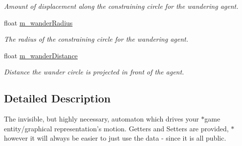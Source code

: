 \begin{DoxyCompactItemize}
\begin{DoxyCompactList}\small\item\em Amount of displacement along the constraining circle for the wandering agent. \end{DoxyCompactList}\item 
\hypertarget{classsteer_1_1_agent_af3adf53b47e918c4deb1196e2125a9c5}{float \hyperlink{classsteer_1_1_agent_af3adf53b47e918c4deb1196e2125a9c5}{m\-\_\-wander\-Radius}}\label{classsteer_1_1_agent_af3adf53b47e918c4deb1196e2125a9c5}

\begin{DoxyCompactList}\small\item\em The radius of the constraining circle for the wandering agent. \end{DoxyCompactList}\item 
\hypertarget{classsteer_1_1_agent_a211c770227c7eb9485eec1b10d03cddd}{float \hyperlink{classsteer_1_1_agent_a211c770227c7eb9485eec1b10d03cddd}{m\-\_\-wander\-Distance}}\label{classsteer_1_1_agent_a211c770227c7eb9485eec1b10d03cddd}

\begin{DoxyCompactList}\small\item\em Distance the wander circle is projected in front of the agent. \end{DoxyCompactList}\end{DoxyCompactItemize}


\subsection{Detailed Description}
The invisible, but highly necessary, automaton which drives your $\ast$game entity/graphical representation's motion. Getters and Setters are provided, $\ast$however it will always be easier to just use the data -\/ since it is all public. 

